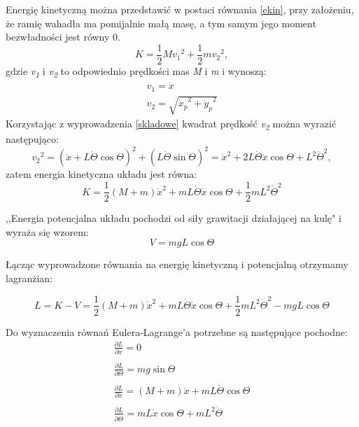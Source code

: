 Energię kinetyczną można przedstawić w postaci równania \ref{ekin}, przy założeniu, że ramię wahadła ma pomijalnie małą masę, a tym samym jego moment bezwładności jest równy 0.
\begin{equation}
    K=\frac{1}{2}M{v_{1}}^{2}+\frac{1}{2}m{v_{2}}^{2},
    \label{ekin}
\end{equation}
gdzie \textit{v\textsubscript{1}} i \textit{v\textsubscript{2}} to odpowiednio prędkości mas \textit{M} i \textit{m} i wynoszą:
\begin{equation}
    \begin{array}{l}
         v_1=\dot{x} \\
         v_2=\sqrt{{\dot{x}_p}^{2}+{\dot{y}_p}^{2}}
    \end{array}
\end{equation}
Korzystając z wyprowadzenia \ref{skladowe} kwadrat prędkość \textit{v\textsubscript{2}} można wyrazić następująco: 
\begin{equation}
    {v_2}^2=(\dot{x}+L\dot{\Theta}\cos{\Theta})^{2}+(L\dot{\Theta}\sin{\Theta})^{2}=\dot{x}^2+2L\dot{\Theta}\dot{x}\cos{\Theta}+L^2\dot{\Theta}^2,
\end{equation}
zatem energia kinetyczna układu jest równa:
\begin{equation}
    K=\frac{1}{2}(M+m)\dot{x}^2+mL\dot{\Theta}\dot{x}\cos{\Theta}+\frac{1}{2}mL^2\dot{\Theta}^2
\end{equation}

,,Energia potencjalna układu pochodzi od siły grawitacji działającej na kulę" \cite{TchMu18} i wyraża się wzorem:
\begin{equation}
    V=mgL\cos{\Theta}
\end{equation}

Łącząc wyprowadzone równania na energię kinetyczną i potencjalną otrzymamy lagranżian:

\begin{equation}
    L=K-V=\frac{1}{2}(M+m)\dot{x}^2+mL\dot{\Theta}\dot{x}\cos{\Theta}+\frac{1}{2}mL^2\dot{\Theta}^2-mgL\cos{\Theta}
\end{equation}

Do wyznaczenia równań Eulera-Lagrange’a potrzebne są następujące pochodne:
\begin{equation}
        \begin{array}{l}
         \frac{\partial L}{\partial x}=0 \\ \\
         \frac{\partial L}{\partial \Theta}=mg\sin{\Theta} \\ \\
         \frac{\partial L}{\partial \dot{x}}=(M+m)\dot{x}+mL\dot{\Theta}\cos{\Theta} \\ \\
         \frac{\partial L}{\partial \dot{\Theta}}=mL\dot{x}\cos{\Theta}+mL^2\dot{\Theta}
    \end{array}
    \label{pochodne}
\end{equation}


